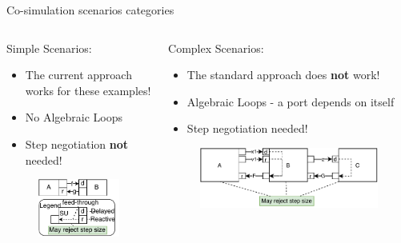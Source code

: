 \documentclass{beamer}
\begin{document}
\begin{frame}{Co-simulation scenarios categories}
    \begin{columns}[T] 
        \begin{column}{.48\textwidth}
        Simple Scenarios:
        \begin{itemize}
            \item The current approach works for these examples!
            \item No Algebraic Loops
            \item Step negotiation \textbf{not} needed!
        \end{itemize}
        \begin{figure}
            \includegraphics[scale=0.6]{images/simple_example.pdf}
            \end{figure}
        \end{column}%
        \hfill%
        \begin{column}{.48\textwidth}
        Complex Scenarios:
        \begin{itemize}
            \item The standard approach does \textbf{not} work!
            \item Algebraic Loops - a port depends on itself
            \item Step negotiation needed!
        \end{itemize}
        \begin{figure}
            \includegraphics[scale=0.6]{images/loop_within_loop.pdf}
        \end{figure}
        \end{column}%
    \end{columns}
\end{frame}
\end{document}
